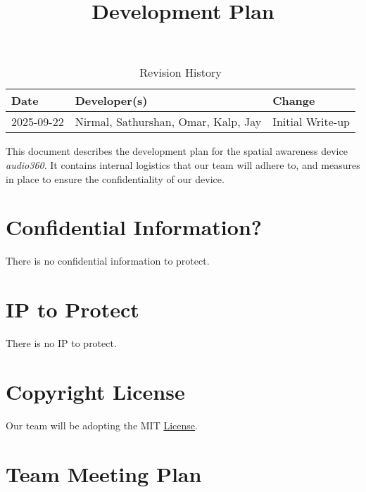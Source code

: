 \documentclass{article}
\title{Development Plan\\\progname}
\author{\authname}
\date{}
\begin{document}
\maketitle

\begin{table}[hp]
\caption{Revision History} \label{TblRevisionHistory}
\begin{tabularx}{\textwidth}{llX}
\toprule
\textbf{Date} & \textbf{Developer(s)} & \textbf{Change}\\
\midrule
2025-09-22 & Nirmal, Sathurshan, Omar, Kalp, Jay & Initial Write-up\\
\bottomrule
\end{tabularx}
\end{table}

\newpage{}

This document describes the development plan for the spatial awareness device \textit{audio360}. It contains internal logistics that our team will adhere to, and measures in place to ensure the confidentiality of our device.

\section{Confidential Information?}

There is no confidential information to protect.

\section{IP to Protect}

There is no IP to protect.

\section{Copyright License}

Our team will be adopting the MIT \href{https://github.com/Nirmal-code/SixSense/blob/main/LICENSE}{License}.

\section{Team Meeting Plan}



\end{document}
